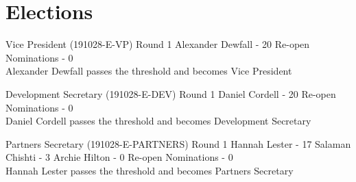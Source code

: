 \documentclass[11pt,hacksoc]{meetingmins}
\begin{document}
\section{Elections}
\begin{items}

  \item Vice President (191028-E-VP)
    \subitem Round 1
      \subsubitem Alexander Dewfall - 20
      \subsubitem Re-open Nominations - 0
      \\
      \subsubitem Alexander Dewfall passes the threshold and becomes Vice President

  \item Development Secretary (191028-E-DEV)
    \subitem Round 1
      \subsubitem Daniel Cordell - 20
      \subsubitem Re-open Nominations - 0
      \\
      \subsubitem Daniel Cordell passes the threshold and becomes Development Secretary

  \item Partners Secretary (191028-E-PARTNERS)
    \subitem Round 1
      \subsubitem Hannah Lester - 17
      \subsubitem Salaman Chishti - 3
      \subsubitem Archie Hilton - 0
      \subsubitem Re-open Nominations - 0
      \\
      \subsubitem Hannah Lester passes the threshold and becomes Partners Secretary
\end{items}
\end{document}
